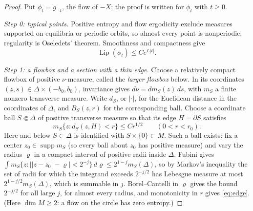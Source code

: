 \documentclass[11pt]{article}
\theoremstyle{remark}
\newcommand{\supp}{\operatorname{supp}}
\newcommand{\Lip}{\operatorname{Lip}}
\begin{document}
\begin{proof}
Put \(\phi_t=g_{-t}\), the flow of \(-X\); the proof is written for
\(\phi_t\) with \(t\ge0\).

\emph{Step 0: typical points.}
Positive entropy and flow ergodicity exclude measures supported on
equilibria or periodic orbits, so almost every point is
nonperiodic; regularity is Oseledets' theorem.  Smoothness and
compactness give
\begin{equation}\label{eq:global-lip}
 \Lip(\phi_t)\le C e^{L|t|}.
\end{equation}

\emph{Step 1: a flowbox and a section with a thin edge.}
Choose a relatively compact flowbox of positive \(\nu\)-measure,
called the \emph{larger flowbox} below.
In its coordinates \((z,s)\in \Delta\times(-b_0,b_0)\), invariance gives
\(d\nu=dm_S(z)\,ds\), with \(m_S\) a finite nonzero transverse
measure.  Write \(d_S\), or \(|\cdot|\), for the Euclidean distance
in the coordinates of \(\Delta\), and \(B_S(z,r)\) for the
corresponding ball.  Choose a coordinate ball \(S\Subset \Delta\) of
positive transverse measure so that its edge \(H=\partial S\)
satisfies
\begin{equation}\label{eq:edge}
 m_S\{z:d_S(z,H)<r\}\le C r^{1/2}\qquad(0<r<r_0).
\end{equation}
Here and below \(S\subset\Delta\) is identified with
\(S\times\{0\}\subset M\).
Such a ball exists: fix a center \(z_0\in\supp m_S\) (so every ball
about \(z_0\) has positive measure) and vary the
radius \(\varrho\) in a compact interval of positive radii inside
\(\Delta\).  Fubini gives
\(\int m_S\{z:|\lvert z-z_0\rvert-\varrho|<2^{-j}\}\,d\varrho
 \le 2^{1-j}m_S(\Delta)\),
so by Markov's inequality the set of radii for which the
integrand exceeds \(2^{-j/2}\) has Lebesgue measure at most
\(2^{1-j/2}m_S(\Delta)\), which is summable in \(j\).
Borel--Cantelli in \(\varrho\) gives the bound
\(2^{-j/2}\) for all large \(j\), for almost every radius, and
monotonicity in \(r\) gives \eqref{eq:edge}.
(Here \(\dim M\ge2\): a flow on the circle has zero entropy.)


\end{proof}
\end{document}
